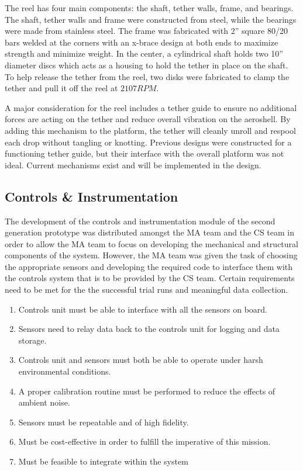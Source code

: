 \indent\indent The reel has four main components: the shaft, tether walls, frame, and bearings. The shaft, tether walls and frame were constructed from steel, while the bearings were made from stainless steel. The frame was fabricated with 2” square 80/20 bars welded at the corners with an x-brace design at both ends to maximize strength and minimize weight.  In the center, a cylindrical shaft holds two 10” diameter discs which acts as a housing to hold the tether in place on the shaft. To help release the tether from the reel, two disks were fabricated to clamp the tether and pull it off the reel at $2107 RPM$.

A major consideration for the reel includes a tether guide to ensure no additional forces are acting on the tether and reduce overall vibration on the aeroshell. By adding this mechanism to the platform, the tether will cleanly unroll and respool each drop without tangling or knotting. Previous designs were constructed for a functioning tether guide, but their interface with the overall platform was not ideal. Current mechanisms exist and will be implemented in the design.


\subsection{Controls \& Instrumentation}

\indent\indent The development of the controls and instrumentation module of the second generation prototype was distributed amongst the MA team and the CS team in order to allow the MA team to focus on developing the mechanical and structural components of the system. However, the MA team was given the task of choosing the appropriate sensors and developing the required code to interface them with the controls system that is to be provided by the CS team.
Certain requirements need to be met for the the successful trial runs and meaningful data collection.

\begin{enumerate}
\item Controls unit must be able to interface with all the sensors on board.
\item Sensors need to relay data back to the controls unit for logging and data storage.
\item Controls unit and sensors must both be able to operate under harsh environmental conditions.
\item A proper calibration routine must be performed to reduce the effects of ambient noise.
\item Sensors must be repeatable and of high fidelity.
\item Must be cost-effective in order to fulfill the imperative of this mission.
\item Must be feasible to integrate within the system
\end{enumerate}

